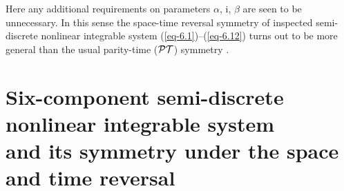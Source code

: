 \documentclass[pdftex]{sigma}
\numberwithin{equation}{section}
\begin{document}
Here any additional requirements on parameters $\alpha$, $\mathrm{i}$, $\beta$ are seen to be unnecessary. In this sense the space-time reversal symmetry of inspected semi-discrete nonlinear integrable system (\ref{eq-6.1})--(\ref{eq-6.12}) turns out to be more general than the usual parity-time ($\cal{PT}$) symmetry \cite{bender-RPP-70-947, konotop-RMP-88-035002}.


\section[Six-component semi-discrete nonlinear integrable system and its symmetry under the space and time reversal]{Six-component semi-discrete nonlinear integrable system \\
and its symmetry under the space and time reversal}
\label{sec7}
\end{document}
